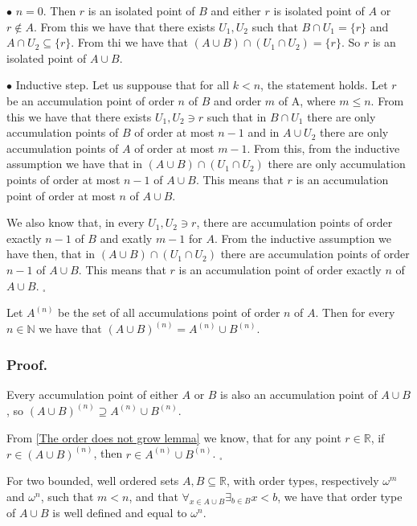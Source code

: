 $\bullet$ $n = 0$. Then $r$ is an isolated point of $B$ and either $r$ is isolated point of $A$ 
or $r \not\in A$. From this we have that there exists $U_1, U_2$ such that $B \cap U_1 = \{r\}$ and 
$A \cap U_2 \subseteq \{r\}$. From thi we have that $(A\cup B) \cap (U_1\cap U_2) = \{r\}$. 
So $r$ is an isolated point of $A \cup B$.

$\bullet$ Inductive step. Let us suppouse that for all $k < n$, the statement holds. Let $r$ 
be an accumulation point of order $n$ of $B$ and order $m$ of A, where $m \leq n$. From this 
we have that there exists $U_1, U_2 \ni r$ 
such that in $B\cap U_1$ there are only accumulation points 
of $B$ of order at most $n-1$ and in $A \cup U_2$ there are only accumulation points of $A$ 
of order at most $m-1$. From this, from the inductive assumption we have that in 
$(A \cup B) \cap (U_1 \cap U_2)$ there are only accumulation points of order at most $n-1$ of 
$A \cup B$.  
This means that $r$ is an accumulation point of order at most $n$ of $A\cup B$. 

We also know that, in every $U_1, U_2 \ni r$, there are accumulation points of order exactly $n-1$ 
of $B$ and exatly $m-1$ for $A$. From the inductive assumption we have then, that in 
$(A \cup B) \cap (U_1 \cap U_2)$ there are accumulation points of order $n-1$ of $A\cup B$. 
This means that $r$ is an accumulation point of order exactly $n$ of $A\cup B$.
$_\square$   


\begin{corollary}\label{derivative and sum is commutative}
Let $A^{(n)}$ be the set of all accumulations point of order $n$ of $A$. Then
for every $n\in\mathbb{N}$ we have that $(A\cup B)^{(n)} = A^{(n)}\cup B^{(n)}$.
\end{corollary}
\subsubsection{Proof.}
Every accumulation point of either $A$ or $B$ is also an accumulation point of $A\cup B$, so 
$(A\cup B)^{(n)} \supseteq A^{(n)}\cup B^{(n)}$.

From \ref{The order does not grow lemma} we know, that for any point $r\in \mathbb{R}$, if 
$r \in (A\cup B)^{(n)}$, then $r \in  A^{(n)}\cup B^{(n)}$. $_\square$

\begin{lemma}\label{key_lemma}
For two bounded, well ordered sets $A, B \subseteq \mathbb{R}$, with order types, respectively 
$\omega^m$ 
and $\omega^n$, 
such that $m < n$, and that $\forall_{x\in A\cup B}\exists_{b\in B}x<b$, we have 
that order type of $A \cup B$ is well defined and 
equal to $\omega^n$.
\end{lemma}
